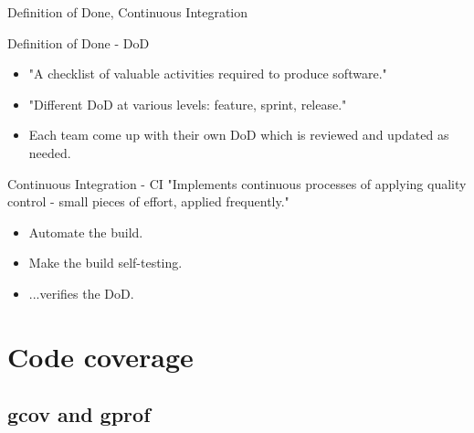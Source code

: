 \documentclass{beamer}
\begin{document}
\begin{frame}{Definition of Done, Continuous Integration}

\begin{block}{Definition of Done - DoD}
\small
\begin{itemize}
  \item "A checklist of valuable activities required to produce software." \cite{dod} 
  \item "Different DoD at various levels: feature, sprint, release."
  \item Each team come up with their own DoD which is reviewed and updated as needed.
\end{itemize}
\end{block}


\begin{block}{Continuous Integration - CI}
\small
"Implements continuous processes of applying quality control - small pieces of effort, applied frequently." \cite{ci}

\begin{itemize}
  \item Automate the build.
  \item Make the build self-testing.
  \item ...verifies the DoD.
\end{itemize}
\end{block}

\end{frame}


\section{Code coverage}

\subsection{gcov and gprof}


\end{document}
